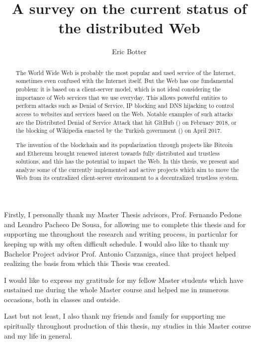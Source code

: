 \documentclass[mscthesis]{usiinfthesis}
\title{A survey on the current status of the distributed Web} %
\subtitle{} %
\author{Eric Botter} %
\begin{document}
\maketitle %

\frontmatter %

\begin{abstract}
The World Wide Web is probably the most popular and used service of the Internet, sometimes even confused with the Internet itself. But the Web has one fundamental problem: it is based on a client-server model, which is not ideal considering the importance of Web services that we use everyday. This allows powerful entities to perform attacks such as Denial of Service, IP blocking and DNS hijacking to control access to websites and services based on the Web. Notable examples of such attacks are the Distributed Denial of Service Attack that hit GitHub (\cite{webarticle:githubddos}) on February 2018, or the blocking of Wikipedia enacted by the Turkish government (\cite{webarticle:turkeywikipedia}) on April 2017.

The invention of the blockchain and its popularization through projects like Bitcoin and Ethereum brought renewed interest towards fully distributed and trustless solutions, and this has the potential to impact the Web. In this thesis, we present and analyze some of the currently implemented and active projects which aim to move the Web from its centralized client-server environment to a decentralized trustless system.

\end{abstract}


\begin{acknowledgements}
Firstly, I personally thank my Master Thesis advisors, Prof. Fernando Pedone and Leandro Pacheco De Sousa, for allowing me to complete this thesis and for supporting me throughout the research and writing process, in particular for keeping up with my often difficult schedule. I would also like to thank my Bachelor Project advisor Prof. Antonio Carzaniga, since that project helped realizing the basis from which this Thesis was created.

I would like to express my gratitude for my fellow Master students which have sustained me during the whole Master course and helped me in numerous occasions, both in classes and outside. %

Last but not least, I also thank my friends and family for supporting me spiritually throughout production of this thesis, my studies in this Master course and my life in general.
\end{acknowledgements}
\end{document}
